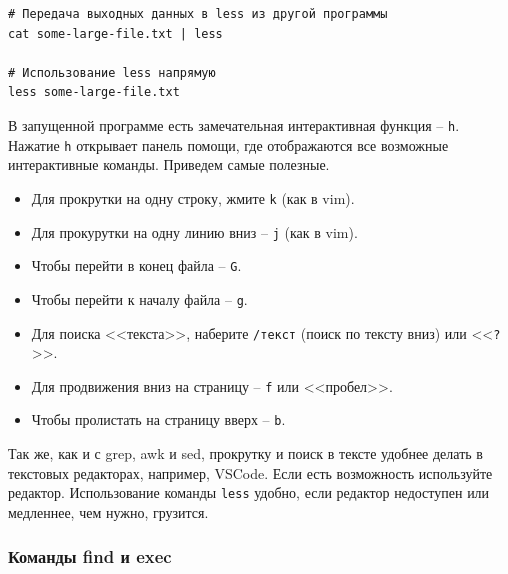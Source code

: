 \documentclass[12pt]{article}
\providecommand{\tightlist}{%
  \setlength{\itemsep}{0pt}\setlength{\parskip}{0pt}}
\begin{document}
\begin{verbatim}
# Передача выходных данных в less из другой программы
cat some-large-file.txt | less

# Использование less напрямую
less some-large-file.txt
\end{verbatim}

В запущенной программе есть замечательная интерактивная функция -- \texttt{h}. Нажатие
\texttt{h} открывает панель помощи, где отображаются все возможные
интерактивные команды. Приведем самые полезные.

\begin{itemize}
\tightlist
\item
  Для прокрутки на одну строку, жмите \texttt{k} (как в vim).
\item
  Для прокурутки на одну линию вниз -- \texttt{j} (как в vim).
\item
  Чтобы перейти в конец файла -- \texttt{G}.
\item
  Чтобы перейти к началу файла -- \texttt{g}.
\item
  Для поиска <<текста>>, наберите \texttt{/текст} (поиск по тексту вниз)
  или <<\texttt{?}>>.
\item
  Для продвижения вниз на страницу -- \texttt{f} или <<пробел>>.
\item
  Чтобы пролистать на страницу вверх -- \texttt{b}.
\end{itemize}

Так же, как и с grep, awk и sed, прокрутку и поиск в тексте удобнее делать в
текстовых редакторах, например, VSCode. Если есть возможность
используйте редактор. Использование команды \texttt{less} удобно, если
редактор недоступен или медленнее, чем нужно, грузится.

\hypertarget{find-and-exec}{%
\subsubsection{\texorpdfstring{\protect\hyperlink{find-and-exec}{}Команды
find и exec}{Команды find и exec}}\label{find-and-exec}}
\end{document}
